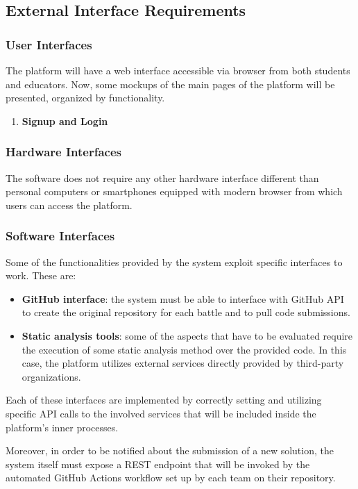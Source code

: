 \subsection{External Interface Requirements}
\subsubsection{User Interfaces}
The platform will have a web interface accessible via browser from both students and educators. 
Now, some mockups of the main pages of the platform will be presented, organized by functionality.


\begin{enumerate}[label=\textbf{F\arabic*)}]
    \item \textbf{Signup and Login}
\end{enumerate}








\subsubsection{Hardware Interfaces}
The software does not require any other hardware interface different than personal computers or smartphones equipped with modern browser from which users can access the platform.
\subsubsection{Software Interfaces}
Some of the functionalities provided by the system exploit specific interfaces to work. These are:
\begin{itemize}
    \item \textbf{GitHub interface}: the system must be able to interface with GitHub API to create the original repository for each battle and to pull code submissions.
    \item \textbf{Static analysis tools}: some of the aspects that have to be evaluated require the execution of some static analysis method over the provided code. In this case, the platform utilizes external services directly provided by third-party organizations.
\end{itemize}
Each of these interfaces are implemented by correctly setting and utilizing specific API calls to the involved services that will be included inside the platform’s inner processes.

Moreover, in order to be notified about the submission of a new solution, the system itself must expose a REST endpoint that will be invoked by the automated GitHub Actions workflow set up by each team on their repository.
